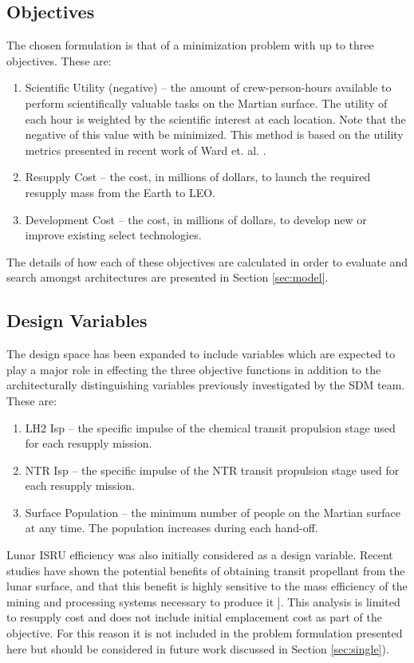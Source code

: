 \documentclass[]{aiaa-pretty}
\begin{document}
\subsection{Objectives}
The chosen formulation is that of a minimization problem with up to three objectives. These are: 
\begin{enumerate}
\item Scientific Utility (negative) – the amount of crew-person-hours available to perform scientifically valuable tasks on the Martian surface. The utility of each hour is weighted by the scientific interest at each location. Note that the negative of this value with be minimized. This method is based on the utility metrics presented in recent work of Ward et. al. \cite{ward2015}.
\item Resupply Cost – the cost, in millions of dollars, to launch the required resupply mass from the Earth to LEO.
\item Development Cost – the cost, in millions of dollars, to develop new or improve existing select technologies.
\end{enumerate}
The details of how each of these objectives are calculated in order to evaluate and search amongst architectures are presented in Section \ref{sec:model}. 
\subsection{Design Variables}
\label{sec:DVs}
The design space has been expanded to include variables which are expected to play a major role in effecting the three objective functions in addition to the architecturally distinguishing variables previously investigated by the SDM team. These are:
\begin{enumerate}
\item	LH2 Isp – the specific impulse of the chemical transit propulsion stage used for each resupply mission.
\item NTR Isp – the specific impulse of the NTR transit propulsion stage used for each resupply mission.
\item	Surface Population – the minimum number of people on the Martian surface at any time. The population increases during each hand-off.
\end{enumerate} 
Lunar ISRU efficiency was also initially considered as a design variable. Recent studies have shown the potential benefits of obtaining transit propellant from the lunar surface, and that this benefit is highly sensitive to the mass efficiency of the mining and processing systems necessary to produce it \cite{ho2014dynamic}]. This analysis is limited to resupply cost and does not include initial emplacement cost as part of the objective. For this reason it is not included in the problem formulation presented here but should be considered in future work discussed in Section \ref{sec:single}). 
\end{document}
